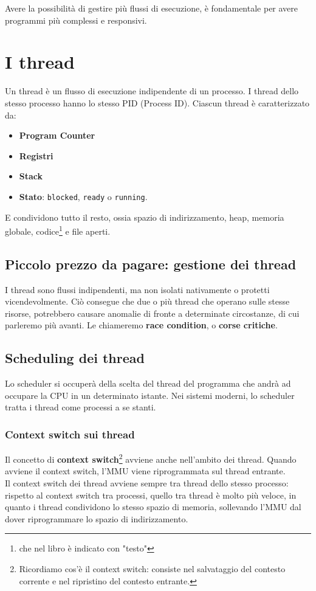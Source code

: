 \documentclass{report}
\begin{document}
Avere la possibilità di gestire più flussi di esecuzione, è fondamentale per avere programmi più complessi e responsivi.


\section{I thread}
Un thread è un flusso di esecuzione indipendente di un processo. I thread dello stesso processo hanno lo stesso PID (Process ID).
Ciascun thread è caratterizzato da:
\begin{itemize}
    \item \textbf{Program Counter}
    \item \textbf{Registri}
    \item \textbf{Stack}
    \item \textbf{Stato}: \verb|blocked|, \verb|ready| o \verb|running|.
\end{itemize}

E condividono tutto il resto, ossia spazio di indirizzamento, heap, memoria globale, codice\footnote{che nel libro è indicato con "testo"} e file aperti.

\subsection{Piccolo prezzo da pagare: gestione dei thread}
I thread sono flussi indipendenti, ma non isolati nativamente o protetti vicendevolmente. Ciò consegue che due o più thread che operano sulle stesse risorse, potrebbero causare anomalie di fronte a determinate circostanze, di cui parleremo più avanti. Le chiameremo \textbf{race condition}, o \textbf{corse critiche}.

\subsection{Scheduling dei thread}
Lo scheduler si occuperà della scelta del thread del programma che andrà ad occupare la CPU in un determinato istante. Nei sistemi moderni, lo scheduler tratta i thread come processi a se stanti.

\subsubsection{Context switch sui thread}
Il concetto di \textbf{context switch}\footnote{Ricordiamo cos'è il context switch: consiste nel salvataggio del contesto corrente e nel ripristino del contesto entrante.} avviene anche nell'ambito dei thread. Quando avviene il context switch, l'MMU viene riprogrammata sul thread entrante.\\
Il context switch dei thread avviene sempre tra thread dello stesso processo: rispetto al context switch tra processi, quello tra thread è molto più veloce, in quanto i thread condividono lo stesso spazio di memoria, sollevando l'MMU dal dover riprogrammare lo spazio di indirizzamento.
\end{document}

